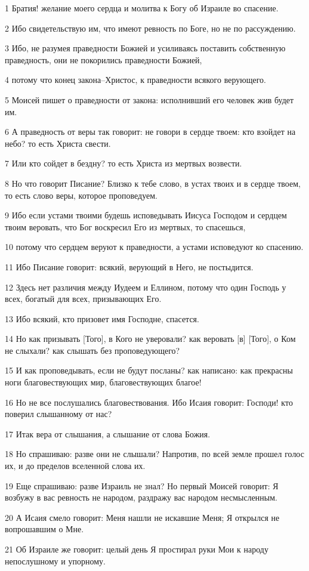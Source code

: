 \par 1 Братия! желание моего сердца и молитва к Богу об Израиле во спасение.
\par 2 Ибо свидетельствую им, что имеют ревность по Боге, но не по рассуждению.
\par 3 Ибо, не разумея праведности Божией и усиливаясь поставить собственную праведность, они не покорились праведности Божией,
\par 4 потому что конец закона--Христос, к праведности всякого верующего.
\par 5 Моисей пишет о праведности от закона: исполнивший его человек жив будет им.
\par 6 А праведность от веры так говорит: не говори в сердце твоем: кто взойдет на небо? то есть Христа свести.
\par 7 Или кто сойдет в бездну? то есть Христа из мертвых возвести.
\par 8 Но что говорит Писание? Близко к тебе слово, в устах твоих и в сердце твоем, то есть слово веры, которое проповедуем.
\par 9 Ибо если устами твоими будешь исповедывать Иисуса Господом и сердцем твоим веровать, что Бог воскресил Его из мертвых, то спасешься,
\par 10 потому что сердцем веруют к праведности, а устами исповедуют ко спасению.
\par 11 Ибо Писание говорит: всякий, верующий в Него, не постыдится.
\par 12 Здесь нет различия между Иудеем и Еллином, потому что один Господь у всех, богатый для всех, призывающих Его.
\par 13 Ибо всякий, кто призовет имя Господне, спасется.
\par 14 Но как призывать [Того], в Кого не уверовали? как веровать [в] [Того], о Ком не слыхали? как слышать без проповедующего?
\par 15 И как проповедывать, если не будут посланы? как написано: как прекрасны ноги благовествующих мир, благовествующих благое!
\par 16 Но не все послушались благовествования. Ибо Исаия говорит: Господи! кто поверил слышанному от нас?
\par 17 Итак вера от слышания, а слышание от слова Божия.
\par 18 Но спрашиваю: разве они не слышали? Напротив, по всей земле прошел голос их, и до пределов вселенной слова их.
\par 19 Еще спрашиваю: разве Израиль не знал? Но первый Моисей говорит: Я возбужу в вас ревность не народом, раздражу вас народом несмысленным.
\par 20 А Исаия смело говорит: Меня нашли не искавшие Меня; Я открылся не вопрошавшим о Мне.
\par 21 Об Израиле же говорит: целый день Я простирал руки Мои к народу непослушному и упорному.

